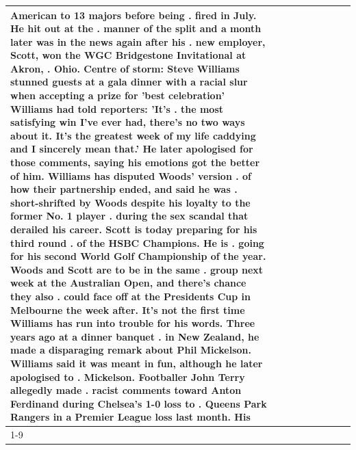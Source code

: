 \begin{table}[H]
\begin{tabular}{lllrlllll}
American to 13 majors before being . fired in July. He hit out at the . manner of the split and a month later was in the news again after his . new employer, Scott, won the WGC Bridgestone Invitational at Akron, . Ohio. Centre of storm: Steve Williams stunned guests at a gala dinner with a racial slur when accepting a prize for 'best celebration' Williams had told reporters: 'It's . the most satisfying win I've ever had, there's no two ways about it. It's the greatest week of my life caddying and I sincerely mean that.' He later apologised for those comments, saying his emotions got the better of him. Williams has disputed Woods' version . of how their partnership ended, and said he was . short-shrifted by Woods despite his loyalty to the former No. 1 player . during the sex scandal that derailed his career. Scott is today preparing for his third round . of the HSBC Champions. He is . going for his second World Golf Championship of the year. Woods and Scott are to be in the same . group next week at the Australian Open, and there's chance they also . could face off at the Presidents Cup in Melbourne the week after. It's not the first time Williams has run into trouble for his words. Three years ago at a dinner banquet . in New Zealand, he made a disparaging remark about Phil Mickelson. Williams said it was meant in fun, although he later apologised to . Mickelson. Footballer John Terry allegedly made . racist comments toward Anton Ferdinand during Chelsea's 1-0 loss to . Queens Park Rangers in a Premier League loss last month. His \\
\cline{1-9}

\end{tabular}
\end{table}

